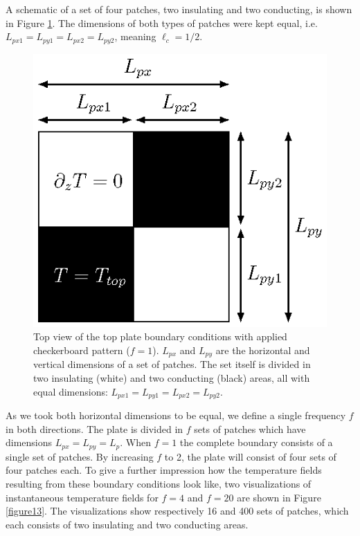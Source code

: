 \documentclass{jfm}
\begin{document}
A schematic of a set of four patches, two insulating and two conducting, is
shown in Figure \ref{figure12}.  The dimensions of both types of patches were
kept equal, i.e. $L_{px1} = L_{py1} = L_{px2} = L_{py2}$, meaning
$\ell_c=1/2$.

\begin{figure}
\centering
\includegraphics{fig10.eps}
\caption{%
Top view of the top plate boundary conditions with applied checkerboard
pattern ($f=1$).  $L_{px}$ and $L_{py}$ are the horizontal and vertical
dimensions of a set of patches.  The set itself is divided in two
insulating (white) and two conducting (black) areas, all with equal
dimensions: $L_{px1} = L_{py1} = L_{px2} = L_{py2}$.}
\label{figure12}
\end{figure}

As we took both horizontal dimensions to be equal, we define a single
frequency $f$ in both directions.  The plate is divided in $f$ sets of patches
which have dimensions $L_{px}=L_{py}=L_p$.  When $f=1$ the complete boundary
consists of a single set of patches.  By increasing $f$ to 2, the plate will
consist of four sets of four patches each.  To give a further impression how
the temperature fields resulting from these boundary conditions look like, two
visualizations of instantaneous temperature fields for $f=4$ and $f=20$ are
shown in Figure \ref{figure13}.  The visualizations show respectively 16 and
400 sets of patches, which each consists of two insulating and two conducting
areas. 
\end{document}
